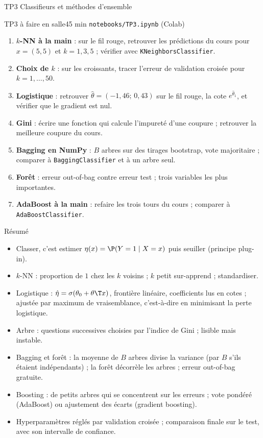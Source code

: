 \documentclass[aspectratio=169,11pt]{beamer}
\begin{document}
\begin{frame}{TP3 \textendash{} Classifieurs et méthodes d'ensemble}
  \footnotesize
  \begin{tp}{TP3 \textendash{} à faire en salle}{45 min \textperiodcentered{} \texttt{notebooks/TP3.ipynb} (Colab)}
    \begin{enumerate}\setlength\itemsep{0pt}
      \item \textbf{$k$-NN à la main} : sur le fil rouge, retrouver les prédictions du cours pour $x=(5,5)$ et $k=1,3,5$ ; vérifier avec \texttt{KNeighborsClassifier}.
      \item \textbf{Choix de $k$} : sur les croissants, tracer l'erreur de validation croisée pour $k=1,\dots,50$.
      \item \textbf{Logistique} : retrouver $\hat\theta=(-1{,}46;\,0{,}43)$ sur le fil rouge, la cote $e^{\hat\theta_1}$, et vérifier que le gradient est nul.
      \item \textbf{Gini} : écrire une fonction qui calcule l'impureté d'une coupure ; retrouver la meilleure coupure du cours.
      \item \textbf{Bagging en NumPy} : $B$ arbres sur des tirages bootstrap, vote majoritaire ; comparer à \texttt{BaggingClassifier} et à un arbre seul.
      \item \textbf{Forêt} : erreur out-of-bag contre erreur test ; trois variables les plus importantes.
      \item \textbf{AdaBoost à la main} : refaire les trois tours du cours ; comparer à \texttt{AdaBoostClassifier}.
    \end{enumerate}
  \end{tp}
\end{frame}

\begin{frame}{Résumé}
  \begin{itemize}\small
    \item Classer, c'est estimer $\eta(x)=\P(Y=1\mid X=x)$ puis seuiller (principe plug-in).
    \item $k$-NN : proportion de $1$ chez les $k$ voisins ; $k$ petit sur-apprend ; standardiser.
    \item Logistique : $\hat\eta=\sigma(\theta_0+\theta\T x)$, frontière linéaire, coefficients lus en cotes ; ajustée par maximum de vraisemblance, c'est-à-dire en minimisant la perte logistique.
    \item Arbre : questions successives choisies par l'indice de Gini ; lisible mais instable.
    \item Bagging et forêt : la moyenne de $B$ arbres divise la variance (par $B$ s'ils étaient indépendants) ; la forêt décorrèle les arbres ; erreur out-of-bag gratuite.
    \item Boosting : de petits arbres qui se concentrent sur les erreurs ; vote pondéré (AdaBoost) ou ajustement des écarts (gradient boosting).
    \item Hyperparamètres réglés par validation croisée ; comparaison finale sur le test, avec son intervalle de confiance.
  \end{itemize}
\end{frame}
\end{document}
